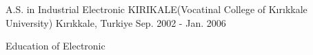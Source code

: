 
\begin{cventries}

  \cventry
    {A.S. in Industrial Electronic} %
    {KIRIKALE(Vocatinal College of Kırıkkale University)} %
    {Kırıkkale, Turkiye} %
    {Sep. 2002 - Jan. 2006} %
    {
      \begin{cvitems} %
        \item {Education of Electronic}
      \end{cvitems}
    }

\end{cventries}
